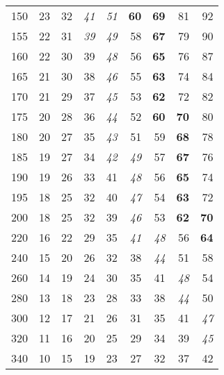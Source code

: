 \documentclass[10pt,letterpaper]{memoir}
\begin{document}
\begin{table}
\begin{tabular}{r|rrrrrrrr}
150  & 23 & 32 & \textit{41} & \textit{51} & \textbf{60} & \textbf{69} & 81 & 92 \\
155  & 22 & 31 & \textit{39} & \textit{49} & 58 & \textbf{67} & 79 & 90 \\
160  & 22 & 30 & 39 & \textit{48} & 56 & \textbf{65} & 76 & 87 \\
165  & 21 & 30 & 38 & \textit{46} & 55 & \textbf{63} & 74 & 84 \\
170  & 21 & 29 & 37 & \textit{45} & 53 & \textbf{62} & 72 & 82 \\
175  & 20 & 28 & 36 & \textit{44} & 52 & \textbf{60} & \textbf{70} & 80 \\
180  & 20 & 27 & 35 & \textit{43} & 51 & 59 & \textbf{68} & 78 \\
185  & 19 & 27 & 34 & \textit{42} & \textit{49} & 57 & \textbf{67} & 76 \\
190  & 19 & 26 & 33 & 41 & \textit{48} & 56 & \textbf{65} & 74 \\
195  & 18 & 25 & 32 & 40 & \textit{47} & 54 & \textbf{63} & 72 \\
200  & 18 & 25 & 32 & 39 & \textit{46} & 53 & \textbf{62} & \textbf{70} \\ 
220  & 16 & 22 & 29 & 35 & \textit{41} & \textit{48} & 56 & \textbf{64} \\
240  & 15 & 20 & 26 & 32 & 38 & \textit{44} & 51 & 58 \\
260  & 14 & 19 & 24 & 30 & 35 & 41 & \textit{48} & 54 \\
280  & 13 & 18 & 23 & 28 & 33 & 38 & \textit{44} & 50 \\
300  & 12 & 17 & 21 & 26 & 31 & 35 & 41 & \textit{47} \\
320  & 11 & 16 & 20 & 25 & 29 & 34 & 39 & \textit{45} \\
340  & 10 & 15 & 19 & 23 & 27 & 32 & 37 & 42 \\
\hline
\end{tabular}
\MakeShortVerb{\|}
\end{table}
\end{document}
